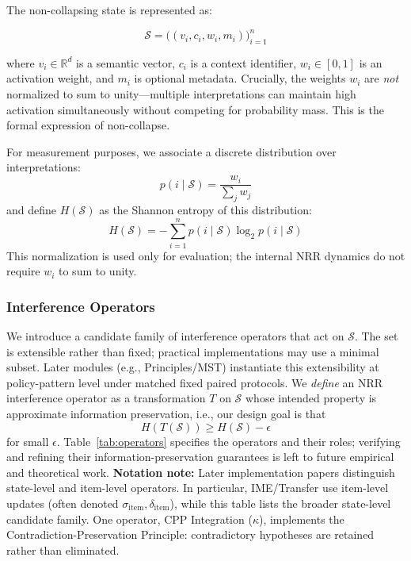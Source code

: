 \documentclass[11pt,a4paper]{article}
\begin{document}
The non-collapsing state is represented as:

\begin{equation}
\mathcal{S} = \bigl((v_i, c_i, w_i, m_i)\bigr)_{i=1}^{n}
\end{equation}

where $v_i \in \mathbb{R}^d$ is a semantic vector, $c_i$ is a context identifier, $w_i \in [0,1]$ is an activation weight, and $m_i$ is optional metadata. Crucially, the weights $w_i$ are \textit{not} normalized to sum to unity---multiple interpretations can maintain high activation simultaneously without competing for probability mass. This is the formal expression of non-collapse.

For measurement purposes, we associate a discrete distribution over interpretations:
\begin{equation}
p(i \mid \mathcal{S}) = \frac{w_i}{\sum_j w_j}
\end{equation}
and define $H(\mathcal{S})$ as the Shannon entropy of this distribution:
\begin{equation}
H(\mathcal{S}) = - \sum_{i=1}^{n} p(i \mid \mathcal{S}) \log_2 p(i \mid \mathcal{S})
\end{equation}
This normalization is used only for evaluation; the internal NRR dynamics do not require $w_i$ to sum to unity.

\subsubsection{Interference Operators}

We introduce a candidate family of interference operators that act on $\mathcal{S}$.
The set is extensible rather than fixed; practical implementations may use a minimal subset.
Later modules (e.g., Principles/MST) instantiate this extensibility at policy-pattern level under matched fixed paired protocols.
We \emph{define} an NRR interference operator as a transformation $T$ on $\mathcal{S}$
whose intended property is approximate information preservation, i.e., our design goal is that
\begin{equation}
H(T(\mathcal{S})) \geq H(\mathcal{S}) - \epsilon
\end{equation}
for small $\epsilon$.
Table~\ref{tab:operators} specifies the operators and their roles; verifying and refining their information-preservation guarantees is left to future empirical and theoretical work.
\textbf{Notation note:} Later implementation papers distinguish state-level and item-level operators.
In particular, IME/Transfer use item-level updates (often denoted $\sigma_{\text{item}}, \delta_{\text{item}}$),
while this table lists the broader state-level candidate family.
One operator, CPP Integration ($\kappa$), implements the Contradiction-Preservation Principle: contradictory hypotheses are retained rather than eliminated.
\end{document}
